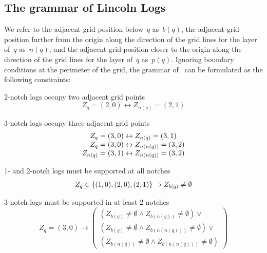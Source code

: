 \subsection{The grammar of Lincoln Logs}
\label{sec-ll1:grammar}


We refer to the adjacent grid position below~$q$ as~$b(q)$, the adjacent grid
position further from the origin along the direction of the grid lines for the
layer of~$q$ as~$n(q)$, and the adjacent grid position closer to the origin
along the direction of the grid lines for the layer of~$q$ as~$p(q)$.
%
Ignoring boundary conditions at the perimeter of the grid, the grammar of
\LincolnLogs\ can be formulated as the following constraints:
%
\begin{compactenum}[a)]
%
\item 2-notch logs occupy two adjacent grid points
%
\label{constraintA}
%
\begin{displaymath}
Z_q=(2,0)\leftrightarrow Z_{n(q)}=(2,1)
\end{displaymath}
%
\item 3-notch logs occupy three adjacent grid points
%
\label{constraintB}
%
\begin{displaymath}
\begin{array}{r@{\;}c@{\;}l}
Z_q=(3,0)&\leftrightarrow&Z_{n(q)}=(3,1)\\
Z_q=(3,0)&\leftrightarrow&Z_{n(n(q))}=(3,2)\\
Z_{n(q)}=(3,1)&\leftrightarrow&Z_{n(n(q))}=(3,2)
\end{array}
\end{displaymath}
%
\item 1- and 2-notch logs must be supported at all notches
%
\label{constraintC}
%
\begin{displaymath}
Z_q\in\{(1,0),(2,0),(2,1)\}\rightarrow Z_{b(q)}\not=\emptyset
\end{displaymath}
%
\item 3-notch logs must be supported in at least 2 notches
%
\label{constraintD}
%
\begin{displaymath}
Z_q=(3,0)\rightarrow
\left(\begin{array}{l}
\left(Z_{b(q)}\not=\emptyset\wedge Z_{b(n(q))}\not=\emptyset\right)\vee\\
\left(Z_{b(q)}\not=\emptyset\wedge Z_{b(n(n(q)))}\not=\emptyset\right)\vee\\
\left(Z_{b(n(q))}\not=\emptyset\wedge Z_{b(n(n(q)))}\not=\emptyset\right)
\end{array}\right)

\end{displaymath}
\end{compactenum}
